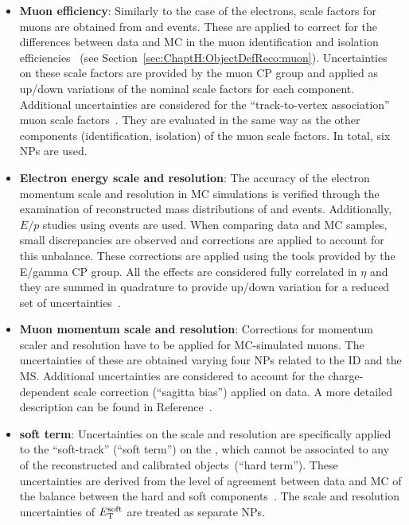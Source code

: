 \begin{itemize}
	\item \textbf{Muon efficiency}: Similarly to the case of the electrons, scale factors for muons are obtained from \Zmpmm 
	and \Jmm events. These are applied to correct for the differences between data and MC in the muon identification 
	and isolation efficiencies~\cite{MUON-2018-03} (see Section~\ref{sec:ChaptH:ObjectDefReco:muon}).
	Uncertainties on these scale factors are provided by the muon CP group %
	and applied as up/down variations of the nominal scale factors for each component.
	Additional uncertainties are considered for the ``track-to-vertex association'' 
	muon scale factors~\cite{PERF-2015-10,MUON-2018-03}. They are evaluated in the same way as 
	the other components (identification, isolation) of the muon scale factors. In total, six NPs are used.


	\item \textbf{Electron energy scale and resolution}: The accuracy of the electron momentum 
	scale and resolution in MC simulations is verified through the examination of reconstructed 
	mass distributions of \Zepem and \Jee events. Additionally, $E/p$ studies using \Wen events are
	used. 
	When comparing data and MC samples, small discrepancies are observed and corrections 
	are applied to account for this unbalance.  These corrections are applied using the tools
	provided by the E/gamma CP group. All the effects are 
	considered fully correlated in $\eta$ and they are summed in quadrature to provide up/down
	variation for a reduced set of uncertainties~\cite{EGAM-2018-01,PERF-2017-01}.
	
	\item \textbf{Muon momentum scale and resolution}:	 Corrections for momentum scaler and resolution
		have to be applied for MC-simulated muons. The uncertainties of these are obtained varying
		four NPs related to the ID and the MS. 
		Additional uncertainties are considered to account for the charge-dependent scale 
		correction (``sagitta bias'') applied on data. A more detailed description can be found 
		in Reference~\cite{PERF-2015-10,MUON-2018-03}.  
		
	\item \textbf{\MET soft term}: Uncertainties on the scale and resolution are specifically applied 
		to the ``soft-track'' (``soft term'') on the \met, which cannot be associated to any of the 
  		reconstructed and calibrated objects~(``hard term''). These uncertainties are derived 
		from the level of agreement between data and MC of the \pt balance between the 
  		hard and soft \met components~\cite{PERF-2016-07}. The scale and resolution uncertainties 
		of $E_{\text{T}}^{\text{soft}}$ are treated as separate NPs.
	
	
\end{itemize}


